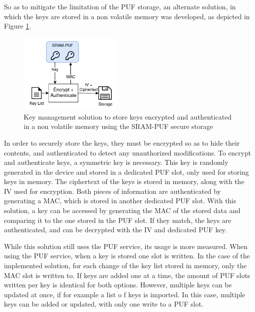 So as to mitigate the limitation of the PUF storage, an alternate solution, in which the keys are stored in a non volatile memory was developed, as depicted in Figure \ref{fig:implementation:key-management}.
\begin{figure}[h!]
	\centering
	\includegraphics[width=0.45\textwidth]{./Images/key-management.png}
	\caption{Key management solution to store keys encrypted and authenticated in a non volatile memory using the SRAM-PUF secure storage}
	\label{fig:implementation:key-management}
\end{figure}
In order to securely store the keys, they must be encrypted so as to hide their contents, and authenticated to detect any unauthorized modifications.
To encrypt and authenticate keys, a symmetric key is necessary. This key is randomly generated in the device and stored in a dedicated PUF slot, only used for storing keys in memory.
The ciphertext of the keys is stored in memory, along with the IV used for encryption.
Both pieces of information are authenticated by generating a MAC, which is stored in another dedicated PUF slot.
With this solution, a key can be accessed by generating the MAC of the stored data and comparing it to the one stored in the PUF slot. If they match, the keys are authenticated, and can be decrypted with the IV and dedicated PUF key.

While this solution still uses the PUF service, its usage is more measured. When using the PUF service, when a key is stored one slot is written.
In the case of the implemented solution, for each change of the key list stored in memory, only the MAC slot is written to.
If keys are added one at a time, the amount of PUF slots written per key is identical for both options. However, multiple keys can be updated at once, if for example a list o f keys is imported. In this case, multiple keys can be added or updated, with only one write to a PUF slot.

